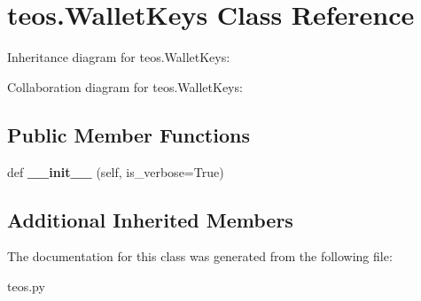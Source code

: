 \hypertarget{classteos_1_1WalletKeys}{}\section{teos.\+Wallet\+Keys Class Reference}
\label{classteos_1_1WalletKeys}


Inheritance diagram for teos.\+Wallet\+Keys\+:


Collaboration diagram for teos.\+Wallet\+Keys\+:
\subsection*{Public Member Functions}
\begin{DoxyCompactItemize}
\item 
\mbox{\label{classteos_1_1WalletKeys_a8a0b1b40366db823900544711e183cb5}} 
def {\bfseries \+\_\+\+\_\+init\+\_\+\+\_\+} (self, is\+\_\+verbose=True)
\end{DoxyCompactItemize}
\subsection*{Additional Inherited Members}


The documentation for this class was generated from the following file\+:\begin{DoxyCompactItemize}
\item 
teos.\+py\end{DoxyCompactItemize}
